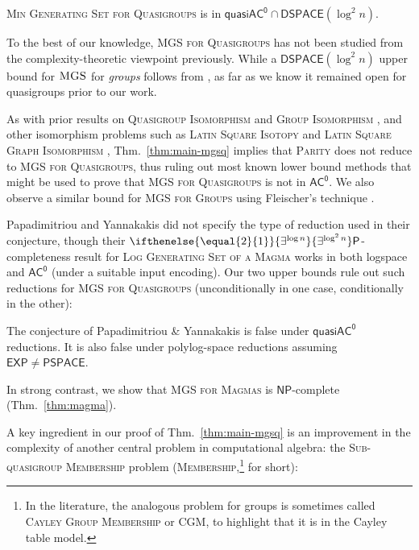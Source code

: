 \documentclass{theoretics}
\newcommand{\algprobm}[1]{\textsc{#1}\xspace}
\newcommand{\betacc}[1]{\ifthenelse{\equal{#1}{1}}{\exists^{\log n}}{\exists^{\log^{#1}n}}} %
\newcommand*{\ComplexityClass}[1]{\ensuremath{\mathsf{#1}}\xspace}
\newcommand*{\NP}{\ComplexityClass{NP}}
\renewcommand{\P}{\ComplexityClass{P}}
\newcommand*{\EXP}{\ComplexityClass{EXP}}
\newcommand*{\PSPACE}{\ComplexityClass{PSPACE}}
\newcommand{\ACz}{\ComplexityClass{AC^0}}
\newcommand{\qACz}{\ComplexityClass{quasiAC^0}}
\newcommand{\DSPACE}{\ComplexityClass{DSPACE}}
\begin{document}
\begin{theorem} \label{thm:main-mgsq}
\algprobm{Min Generating Set for Quasigroups} is in $\qACz \cap \DSPACE(\log^2 n)$. 
\end{theorem}

To the best of our knowledge, \algprobm{MGS for Quasigroups} has not been studied from the complexity-theoretic viewpoint previously. While a $\DSPACE(\log^2 n)$ upper bound for $\algprobm{MGS}$ for \emph{groups} follows from \cite{TangThesis, ArvindToran}, as far as we know it remained open for quasigroups prior to our work. 

As with prior results on \algprobm{Quasigroup Isomorphism} and \algprobm{Group Isomorphism} \cite{ChattopadhyayToranWagner}, and other isomorphism problems such as  \algprobm{Latin Square Isotopy} and  \algprobm{Latin Square Graph Isomorphism} \cite{LevetLatinSquares}, Thm.~\ref{thm:main-mgsq} implies that \algprobm{Parity} does not reduce to \algprobm{MGS for Quasigroups}, thus ruling out most known lower bound methods that might be used to prove that \algprobm{MGS for Quasigroups} is not in $\ACz$. We also observe a similar bound for \algprobm{MGS for Groups} using Fleischer's technique \cite{Fleischer}. 

Papadimitriou and Yannakakis did not specify the type of reduction used in their conjecture, though their $\betacc{2}\P$-completeness result for \algprobm{Log Generating Set of a Magma} works in both logspace and $\ACz$ (under a suitable input encoding). Our two upper bounds rule out such reductions for \algprobm{MGS for Quasigroups} (unconditionally in one case, conditionally in the other):

\begin{corollary}
The conjecture of Papadimitriou \& Yannakakis \cite[p.~169]{PY} is false under $\qACz$ reductions. It is also false under polylog-space reductions assuming $\EXP \neq \PSPACE$.
\end{corollary}

In strong contrast, we show that \algprobm{MGS for Magmas} is \NP-complete (Thm.~\ref{thm:magma}).

A key ingredient in our proof of Thm.~\ref{thm:main-mgsq} is an improvement in the complexity of another central problem in computational algebra: the \algprobm{Sub-quasigroup Membership} problem (\algprobm{Membership},\footnote{In the literature, the analogous problem for groups is sometimes called \algprobm{Cayley Group Membership} or \algprobm{CGM}, to highlight that it is in the Cayley table model.} for short):
\end{document}

